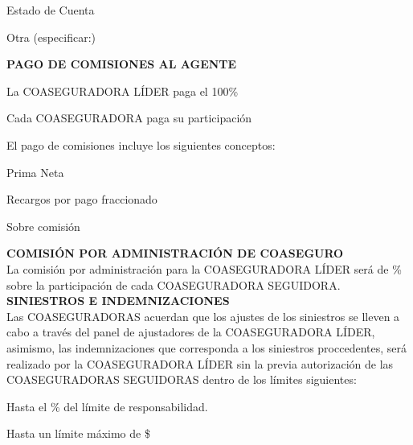 \documentclass[letterpaper,10pt]{article}
\begin{document}
\begin{todolist}
    \item Estado de Cuenta
    \item Otra (especificar:) \underline{\hspace{5cm}}
\end{todolist}

\textbf{PAGO DE COMISIONES AL AGENTE}

\begin{todolist}
    \item La COASEGURADORA LÍDER paga el 100\%
    \item Cada COASEGURADORA paga su participación
\end{todolist}

El pago de comisiones incluye los siguientes conceptos:

\begin{todolist}
    \item Prima Neta
    \item Recargos por pago fraccionado
    \item Sobre comisión
\end{todolist}

\textbf{COMISIÓN POR ADMINISTRACIÓN DE COASEGURO}\\

La comisión por administración para la COASEGURADORA LÍDER será de \underline{\hspace{2cm}}\% sobre la participación de cada COASEGURADORA SEGUIDORA.\\

\textbf{SINIESTROS E INDEMNIZACIONES}\\

Las COASEGURADORAS acuerdan que los ajustes de los siniestros se lleven a cabo a través del panel de ajustadores de la COASEGURADORA LÍDER, asimismo, las indemnizaciones que corresponda a los siniestros proccedentes, será realizado por la COASEGURADORA LÍDER sin la previa autorización de las COASEGURADORAS SEGUIDORAS dentro de los límites siguientes:

\begin{todolist}
    \item Hasta el \underline{\hspace{1cm}}\% del límite de responsabilidad.
    \item Hasta un límite máximo de \$\underline{\hspace{2cm}}
\end{todolist}
\newpage
\end{document}
